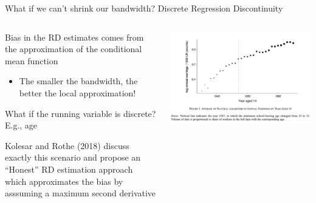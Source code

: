 \documentclass[notes,11pt, aspectratio=169]{beamer}
\newenvironment{wideitemize}{\itemize\addtolength{\itemsep}{10pt}}{\enditemize}
\begin{document}
\begin{frame}{What if we can't shrink our bandwidth? Discrete Regression Discontinuity}
    \begin{columns}[onlytextwidth, T] %
      \begin{column}{.6\textwidth}
        \begin{wideitemize}
        \item Bias in the RD estimates comes from the approximation of
          the conditional mean function
          \begin{itemize}
          \item The smaller the bandwidth, the better the local approximation!
          \end{itemize}
        \item What if the running variable is discrete? E.g., age
        \item Kolesar and Rothe (2018) discuss exactly this scenario
          and propose an ``Honest'' RD estimation approach which
          approximates the bias by asssuming a maximum second
          derivative
        \end{wideitemize}
      \end{column}%
      \hfill%
      \begin{column}{.4\textwidth}
        \includegraphics[width=\linewidth]{images/rdhonest_1.png}
      \end{column}%
    \end{columns}
\end{frame}
\end{document}
